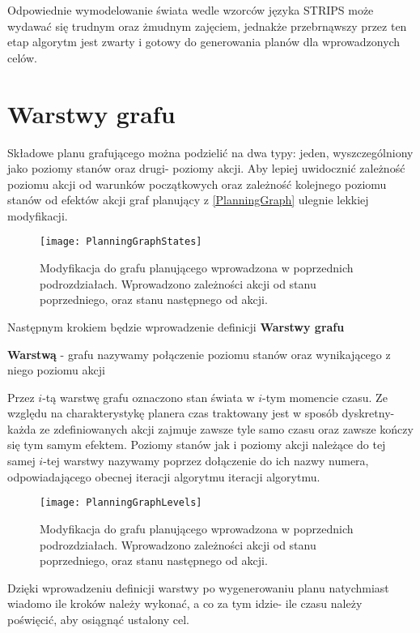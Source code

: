     
    Odpowiednie wymodelowanie świata wedle wzorców języka STRIPS może wydawać się trudnym oraz żmudnym zajęciem, jednakże przebrnąwszy 
    przez ten etap algorytm jest zwarty i gotowy do generowania planów dla wprowadzonych celów.


\section{Warstwy grafu}
    Składowe planu grafującego można podzielić na dwa typy: jeden, wyszczególniony jako poziomy stanów oraz drugi- poziomy akcji. Aby lepiej 
    uwidocznić zależność poziomu akcji od warunków początkowych oraz zależność kolejnego poziomu stanów od efektów akcji graf planujący 
    z \ref{PlanningGraph} ulegnie lekkiej modyfikacji. 
    \begin{figure}[H]
        \texttt{[image: PlanningGraphStates]}
        \centering
        \caption{Modyfikacja do grafu planującego wprowadzona w poprzednich podrozdziałach. Wprowadzono zależności akcji od stanu poprzedniego, oraz stanu 
        następnego od akcji.}
        \label{PlanningGraphStates}
    \end{figure}
    Następnym krokiem będzie wprowadzenie definicji \textbf{Warstwy grafu}
    \begin{definition}
        \label{Warstwa}
        \textbf{Warstwą} - grafu nazywamy połączenie poziomu stanów oraz wynikającego z niego poziomu akcji
    \end{definition}
    Przez $i$-tą warstwę grafu oznaczono stan świata w $i$-tym momencie czasu. Ze względu na charakterystykę planera czas traktowany jest w sposób dyskretny-
    każda ze zdefiniowanych akcji zajmuje zawsze tyle samo czasu oraz zawsze kończy się tym samym efektem. Poziomy stanów jak i poziomy akcji 
    należące do tej samej $i$-tej warstwy nazywamy poprzez dołączenie do ich nazwy numera, odpowiadającego obecnej iteracji algorytmu
    iteracji algorytmu.
    \begin{figure}[H]
        \texttt{[image: PlanningGraphLevels]}
        \centering
        \caption{Modyfikacja do grafu planującego wprowadzona w poprzednich podrozdziałach. Wprowadzono zależności akcji od stanu poprzedniego, oraz stanu 
        następnego od akcji.}
        \label{PlanningGraphLevels}
    \end{figure}
    Dzięki wprowadzeniu definicji warstwy po wygenerowaniu 
    planu natychmiast wiadomo ile kroków należy wykonać, a co za tym idzie- ile czasu należy poświęcić, aby osiągnąć ustalony cel. 

